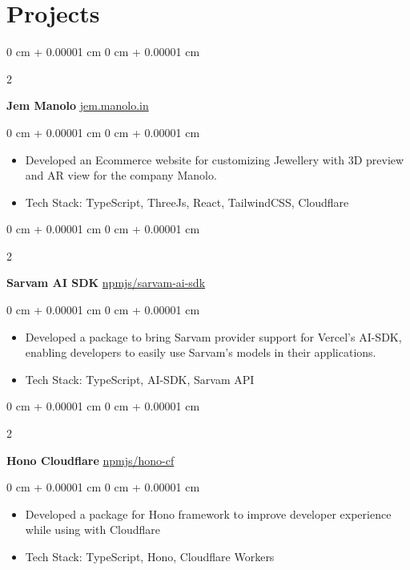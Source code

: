 \documentclass[10pt, letterpaper]{article}
\newenvironment{highlights}{
    \begin{itemize}[
        topsep=0.10 cm,
        parsep=0.10 cm,
        partopsep=0pt,
        itemsep=0pt,
        leftmargin=0 cm + 10pt
    ]
}{
    \end{itemize}
} %
\newenvironment{onecolentry}{
    \begin{adjustwidth}{
        0 cm + 0.00001 cm
    }{
        0 cm + 0.00001 cm
    }
}{
    \end{adjustwidth}
} %
\newenvironment{twocolentry}[2][]{
    \onecolentry
    \def\secondColumn{#2}
    \setcolumnwidth{\fill, 4.5 cm}
    \begin{paracol}{2}
}{
    \switchcolumn \raggedleft \secondColumn
    \end{paracol}
    \endonecolentry
} %
\begin{document}
\section{Projects}

\begin{twocolentry}{
		\href{https://jem.manolo.in}{jem.manolo.in}
	}
	\textbf{Jem Manolo}\end{twocolentry}

\vspace{0.10 cm}
\begin{onecolentry}
	\begin{highlights}
		\item Developed an Ecommerce website for customizing Jewellery with 3D preview and AR view for the company Manolo.
		\item Tech Stack: TypeScript, ThreeJs, React, TailwindCSS, Cloudflare
	\end{highlights}
\end{onecolentry}

\vspace{0.2 cm}

\begin{twocolentry}{
		\href{https://github.com/rajatsandeepsen/sarvam-ai-sdk}{npmjs/sarvam-ai-sdk}
	}
	\textbf{Sarvam AI SDK}\end{twocolentry}

\vspace{0.10 cm}
\begin{onecolentry}
	\begin{highlights}
		\item Developed a package to bring Sarvam provider support for Vercel's AI-SDK, enabling developers to easily use Sarvam's models in their applications.
		\item Tech Stack: TypeScript, AI-SDK, Sarvam API
	\end{highlights}
\end{onecolentry}

\vspace{0.2 cm}

\begin{twocolentry}{
		\href{https://github.com/manolo-in/hono-cf}{npmjs/hono-cf}
	}
	\textbf{Hono Cloudflare}\end{twocolentry}

\vspace{0.10 cm}
\begin{onecolentry}
	\begin{highlights}
		\item Developed a package for Hono framework to improve developer experience while using with Cloudflare
		\item Tech Stack: TypeScript, Hono, Cloudflare Workers
	\end{highlights}
\end{onecolentry}
\end{document}
